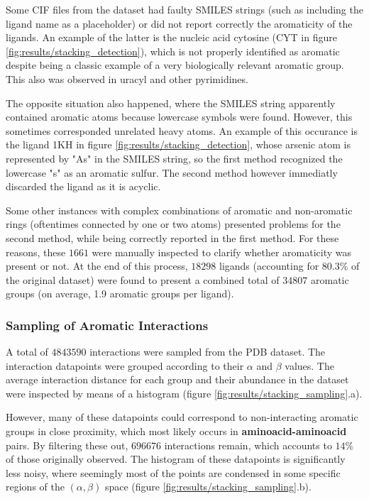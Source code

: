       Some CIF files from the dataset had faulty SMILES strings (such as including the ligand name as a placeholder) or did not report correctly the aromaticity of the ligands. An example of the latter is the nucleic acid cytosine (CYT in figure \ref{fig:results/stacking_detection}), which is not properly identified as aromatic despite being a classic example of a very biologically relevant aromatic group. This also was observed in uracyl and other pyrimidines.

      The opposite situation also happened, where the SMILES string apparently contained aromatic atoms because lowercase symbols were found. However, this sometimes corresponded unrelated heavy atoms. An example of this occurance is the ligand 1KH in figure \ref{fig:results/stacking_detection}, whose arsenic atom is represented by "As" in the SMILES string, so the first method recognized the lowercase "s" as an aromatic sulfur. The second method however immediatly discarded the ligand as it is acyclic.

      Some other instances with complex combinations of aromatic and non-aromatic rings (oftentimes connected by one or two atoms) presented problems for the second method, while being correctly reported in the first method. For these reasons, these $1661$ were manually inspected to clarify whether aromaticity was present or not. At the end of this process, $18298$ ligands (accounting for $80.3 \% $ of the original dataset) were found to present a combined total of $34807$ aromatic groups (on average, 1.9 aromatic groups per ligand).

    \subsubsection{Sampling of Aromatic Interactions}
      A total of $4843590$ interactions were sampled from the PDB dataset. The interaction datapoints were grouped according to their $\alpha$ and $\beta$ values. The average interaction distance for each group and their abundance in the dataset were inspected by means of a histogram (figure \ref{fig:results/stacking_sampling}.a).

      However, many of these datapoints could correspond to non-interacting aromatic groups in close proximity, which most likely occurs in \textbf{aminoacid-aminoacid} pairs. By filtering these out, $696676$ interactions remain, which accounts to $14 \%$ of those originally observed. The histogram of these datapoints is significantly less noisy, where seemingly most of the points are condensed in some specific regions of the $(\alpha, \beta)$ space (figure \ref{fig:results/stacking_sampling}.b).


